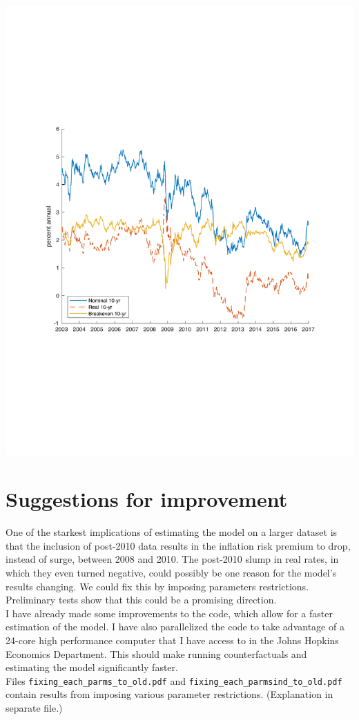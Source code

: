 \documentclass{report}
\begin{document}
\begin{center}
\includegraphics[page=5, trim={5cm 6cm 5cm 6.5cm}]{Figs-Reest-Parms-alldata.pdf}
\end{center}

 
\section{Suggestions for improvement}
 
One of the starkest implications of estimating the model on a larger dataset is that the inclusion of post-2010 data results in the inflation risk premium to drop, instead of surge, between 2008 and 2010. The post-2010 slump in real rates, in which they even turned negative, could possibly be one reason for the model's results changing. We could fix this by imposing parameters restrictions. Preliminary tests show that this could be a promising direction.\\

I have already made some improvements to the code, which allow for a faster estimation of the model. I have also parallelized the code to take advantage of a 24-core high performance computer that I have access to in the Johns Hopkins Economics Department. This should make running counterfactuals and estimating the model significantly faster.\\

Files \texttt{fixing\_each\_parms\_to\_old.pdf} and \texttt{fixing\_each\_parmsind\_to\_old.pdf} contain results from imposing various parameter restrictions. (Explanation in separate file.)
\end{document}
